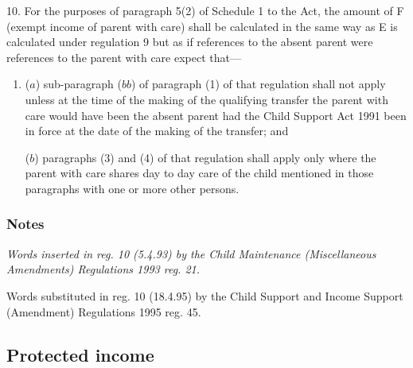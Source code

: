 \documentclass[a4paper]{article}
\newcommand\amendment[1]{\subsubsection*{Notes}{\itshape\frenchspacing\footnotesize #1 \par\goodbreak}}
\begin{document}
10.  For the purposes of paragraph 5(2) of Schedule 1 to the Act, the amount of F (exempt income of parent with care) shall be calculated in the same way as E is calculated under regulation 9 but as if references to the absent parent were references to the parent with care
expect that—
\begin{enumerate}\item[]
($a$) sub-paragraph ($bb$) of paragraph (1) of that regulation shall not apply unless at the time of the making of the qualifying transfer the parent with care would have been the absent parent had the Child Support Act 1991 been in force at the date of the making of the transfer; and

($b$) paragraphs (3) and (4) of that regulation shall apply only where the parent with care shares day to day care of the child mentioned in those paragraphs with one or more other persons.
\end{enumerate}  %

\amendment{
Words inserted in reg. 10 (5.4.93) by the Child Maintenance (Miscellaneous Amendments) Regulations 1993 reg. 21.

Words substituted in reg. 10 (18.4.95) by the Child Support and Income Support (Amendment) Regulations 1995 reg. 45.
}

\subsection[11. Protected income]{Protected income}
\end{document}
